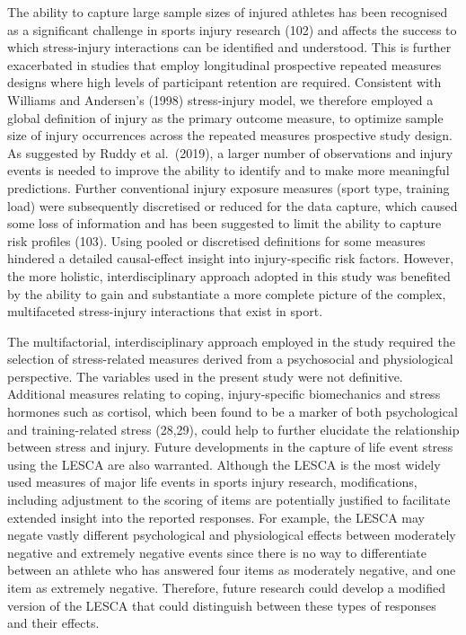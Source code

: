 \documentclass[
  english,
  man]{apa6}
\begin{document}
The ability to capture large sample sizes of injured athletes has been recognised as a significant challenge in sports injury research (102) and affects the success to which stress-injury interactions can be identified and understood.
This is further exacerbated in studies that employ longitudinal prospective repeated measures designs where high levels of participant retention are required.
Consistent with Williams and Andersen's (1998) stress-injury model, we therefore employed a global definition of injury as the primary outcome measure, to optimize sample size of injury occurrences across the repeated measures prospective study design.
As suggested by Ruddy et al.~(2019), a larger number of observations and injury events is needed to improve the ability to identify and to make more meaningful predictions.
Further conventional injury exposure measures (sport type, training load) were subsequently discretised or reduced for the data capture, which caused some loss of information and has been suggested to limit the ability to capture risk profiles (103).
Using pooled or discretised definitions for some measures hindered a detailed causal-effect insight into injury-specific risk factors.
However, the more holistic, interdisciplinary approach adopted in this study was benefited by the ability to gain and substantiate a more complete picture of the complex, multifaceted stress-injury interactions that exist in sport.

The multifactorial, interdisciplinary approach employed in the study required the selection of stress-related measures derived from a psychosocial and physiological perspective.
The variables used in the present study were not definitive.
Additional measures relating to coping, injury-specific biomechanics and stress hormones such as cortisol, which been found to be a marker of both psychological and training-related stress (28,29), could help to further elucidate the relationship between stress and injury.
Future developments in the capture of life event stress using the LESCA are also warranted.
Although the LESCA is the most widely used measures of major life events in sports injury research, modifications, including adjustment to the scoring of items are potentially justified to facilitate extended insight into the reported responses.
For example, the LESCA may negate vastly different psychological and physiological effects between moderately negative and extremely negative events since there is no way to differentiate between an athlete who has answered four items as moderately negative, and one item as extremely negative.
Therefore, future research could develop a modified version of the LESCA that could distinguish between these types of responses and their effects.
\end{document}
